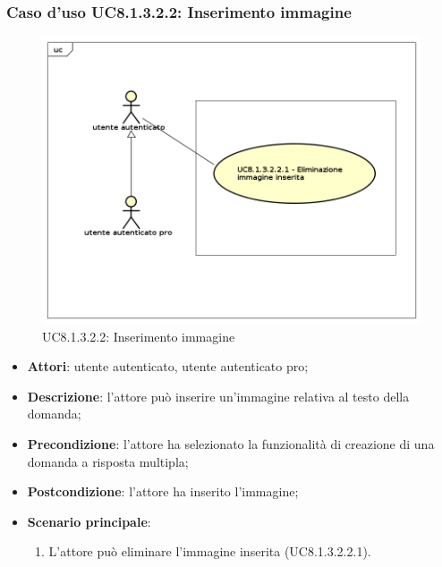 \subsubsection{Caso d'uso UC8.1.3.2.2: Inserimento immagine}
	\label{UC8.1.3.2.2}
	\begin{figure}[h]
		\centering
			\includegraphics[scale=0.45,keepaspectratio]{UML/UC8_1_3_2_2.png}
		\caption{UC8.1.3.2.2: Inserimento immagine}
	\end{figure}
	\FloatBarrier
	\begin{itemize}
		\item
			\textbf{Attori}: utente autenticato, utente autenticato pro;
		\item		
			\textbf{Descrizione}: l'attore può inserire un'immagine relativa al testo della domanda;
		\item
			\textbf{Precondizione}: l'attore ha selezionato la funzionalità di creazione di una domanda a risposta multipla; 
		\item
			\textbf{Postcondizione}: l'attore ha inserito l'immagine;
		\item
			\textbf{Scenario principale}: 
				\begin{enumerate}
					\item
						L'attore può eliminare l'immagine inserita (UC8.1.3.2.2.1).	
				\end{enumerate}				
	\end{itemize}

